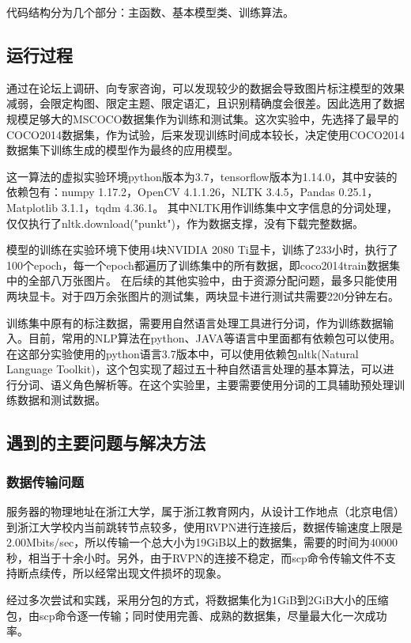 代码结构分为几个部分：主函数、基本模型类、训练算法。
\subsection{运行过程}
通过在论坛上调研、向专家咨询，可以发现较少的数据会导致图片标注模型的效果减弱，会限定构图、限定主题、限定语汇，且识别精确度会很差。因此选用了数据规模足够大的MSCOCO数据集作为训练和测试集。这次实验中，先选择了最早的COCO2014数据集，作为试验，后来发现训练时间成本较长，决定使用COCO2014数据集下训练生成的模型作为最终的应用模型。

这一算法的虚拟实验环境python版本为3.7，tensorflow版本为1.14.0，其中安装的依赖包有：numpy 1.17.2，OpenCV 4.1.1.26，NLTK 3.4.5，Pandas 0.25.1，Matplotlib 3.1.1，tqdm 4.36.1。
其中NLTK用作训练集中文字信息的分词处理，仅仅执行了nltk.download("punkt")，作为数据支撑，没有下载完整数据。

模型的训练在实验环境下使用4块NVIDIA 2080 Ti显卡，训练了233小时，执行了100个epoch，每一个epoch都遍历了训练集中的所有数据，即coco2014train数据集中的全部八万张图片。
在后续的其他实验中，由于资源分配问题，最多只能使用两块显卡。对于四万余张图片的测试集，两块显卡进行测试共需要220分钟左右。

训练集中原有的标注数据，需要用自然语言处理工具进行分词，作为训练数据输入。目前，常用的NLP算法在python、JAVA等语言中里面都有依赖包可以使用。
在这部分实验使用的python语言3.7版本中，可以使用依赖包nltk(Natural Language Toolkit)，这个包实现了超过五十种自然语言处理的基本算法，可以进行分词、语义角色解析等。在这个实验里，主要需要使用分词的工具辅助预处理训练数据和测试数据。

\subsection{遇到的主要问题与解决方法}
\subsubsection{数据传输问题}
服务器的物理地址在浙江大学，属于浙江教育网内，从设计工作地点（北京电信）到浙江大学校内当前跳转节点较多，使用RVPN进行连接后，数据传输速度上限是2.00Mbits/sec，所以传输一个总大小为19GiB以上的数据集，需要的时间为40000秒，相当于十余小时。另外，由于RVPN的连接不稳定，而scp命令传输文件不支持断点续传，所以经常出现文件损坏的现象。

经过多次尝试和实践，采用分包的方式，将数据集化为1GiB到2GiB大小的压缩包，由scp命令逐一传输；同时使用完善、成熟的数据集，尽量最大化一次成功率。

